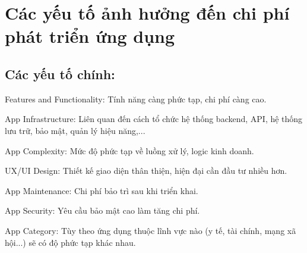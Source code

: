 \section{Các yếu tố ảnh hưởng đến chi phí phát triển ứng dụng}

\subsection{Các yếu tố chính:}
\renewcommand{\labelitemi}{--}    
    \begin{flushleft}
        \hspace*{0.8cm}Features and Functionality: Tính năng càng phức tạp, chi phí càng cao.
    \end{flushleft}

    \begin{flushleft}
      \hspace*{0.8cm}App Infrastructure: Liên quan đến cách tổ chức hệ thống backend, API, hệ thống lưu trữ, bảo mật, quản lý hiệu năng,...
    \end{flushleft}

    \begin{flushleft}
      \hspace*{0.8cm}App Complexity: Mức độ phức tạp về luồng xử lý, logic kinh doanh.
    \end{flushleft}

    \begin{flushleft}
      \hspace*{0.8cm}UX/UI Design: Thiết kế giao diện thân thiện, hiện đại cần đầu tư nhiều hơn.
    \end{flushleft}

    \begin{flushleft}
      \hspace*{0.8cm}App Maintenance: Chi phí bảo trì sau khi triển khai.
    \end{flushleft}

    \begin{flushleft}
      \hspace*{0.8cm}App Security: Yêu cầu bảo mật cao làm tăng chi phí.
    \end{flushleft}

    \begin{flushleft}
      \hspace*{0.8cm}App Category: Tùy theo ứng dụng thuộc lĩnh vực nào (y tế, tài chính, mạng xã hội...) sẽ có độ phức tạp khác nhau.
    \end{flushleft}


